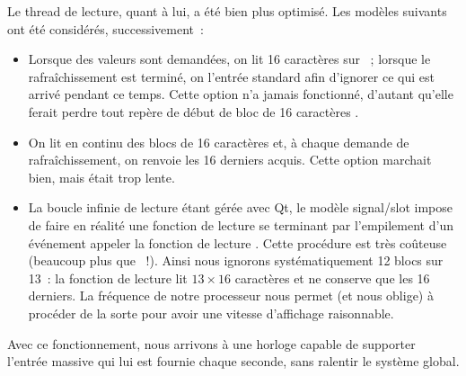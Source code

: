 \documentclass[11pt,a4paper]{article}
\begin{document}
Le thread de lecture, quant à lui, a été bien plus optimisé. Les modèles suivants ont été considérés, successivement~:
\begin{itemize}
\item Lorsque des valeurs sont demandées, on lit 16 caractères sur ~; lorsque le rafraîchissement est terminé, on  l'entrée standard afin d'ignorer ce qui est arrivé pendant ce temps. Cette option n'a jamais fonctionné, d'autant qu'elle ferait perdre tout repère de \og début de bloc de 16 caractères \fg{}.

\item On lit en continu des blocs de 16 caractères et, à chaque demande de rafraîchissement, on renvoie les 16 derniers acquis. Cette option marchait bien, mais était trop lente.

\item La \og boucle infinie \fg{} de lecture étant gérée avec Qt, le modèle signal/slot impose de faire en réalité une fonction de lecture se terminant par l'empilement d'un événement \og appeler la fonction de lecture \fg{}. Cette procédure est très coûteuse (beaucoup plus que ~!). Ainsi nous ignorons systématiquement 12 blocs sur 13~: la fonction de lecture lit $13 \times 16$ caractères et ne conserve que les 16 derniers. La fréquence de notre processeur nous permet (et nous oblige) à procéder de la sorte pour avoir une vitesse d'affichage raisonnable.
\end{itemize}

Avec ce fonctionnement, nous arrivons à une horloge capable de supporter l'entrée massive qui lui est fournie chaque seconde, sans ralentir le système global.
\end{document}
